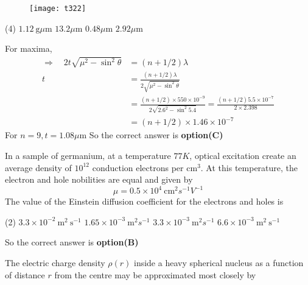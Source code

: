 \begin{questions}
\begin{minipage}{\textwidth}
\end{minipage}
\begin{figure}[H]
	\centering
	\texttt{[image: t322]}
\end{figure}
\begin{tasks}(4)
	\task[\textbf{A.}]   $1.12 \mathrm{~g} \mu \mathrm{m}$
	\task[\textbf{B.}] $13.2 \mu \mathrm{m}$
	\task[\textbf{C.}] $0.48 \mu \mathrm{m}$
	\task[\textbf{D.}] $2.92 \mu \mathrm{m}$
\end{tasks}
\begin{answer}
	For maxima,
	$$
	\begin{aligned}
	\Rightarrow \quad 2 t \sqrt{\mu^{2}-\sin ^{2} \theta} &=(n+1 / 2) \lambda \\
	t &=\frac{(n+1 / 2) \lambda}{2 \sqrt{\mu^{2}-\sin ^{2} \theta}} \\
	&=\frac{(n+1 / 2) \times 550 \times 10^{-9}}{2 \sqrt{2.6^{2}-\sin ^{2} 5.4}}=\frac{(n+1 / 2) 5.5 \times 10^{-7}}{2 \times 2.398} \\
	&=(n+1 / 2) \times 1.46 \times 10^{-7}
	\end{aligned}
	$$
	For $n=9, t=1.08 \mu \mathrm{m}$
	So the correct answer is \textbf{option(C)}
\end{answer}
\begin{minipage}{\textwidth}
	\question In a sample of germanium, at a temperature $77 K$, optical excitation create an average density of $10^{12}$ conduction electrons per $\mathrm{cm}^{3}$. At this temperature, the electron and hole nobilities are equal and given by
	$$
	\mu=0.5 \times 10^{4} \mathrm{~cm}^{2} s^{-1} V^{-1}
	$$
	The value of the Einstein diffusion coefficient for the electrons and holes is
\end{minipage}
\begin{tasks}(2)
	\task[\textbf{A.}] $3.3 \times 10^{-2} \mathrm{~m}^{2} \mathrm{~s}^{-1}$
	\task[\textbf{B.}] $1.65 \times 10^{-3} \mathrm{~m}^{2} s^{-1}$
	\task[\textbf{C.}] $3.3 \times 10^{-3} \mathrm{~m}^{2} s^{-1}$
	\task[\textbf{D.}] $6.6 \times 10^{-3} \mathrm{~m}^{2} \mathrm{~s}^{-1}$
\end{tasks}
\begin{answer}
	So the correct answer is \textbf{option(B)}
\end{answer}
\begin{minipage}{\textwidth}
	\question The electric charge density $\rho(r)$ inside a heavy spherical nucleus as a function of distance $r$ from the centre may be approximated most closely by 

\end{minipage}
\end{questions}
